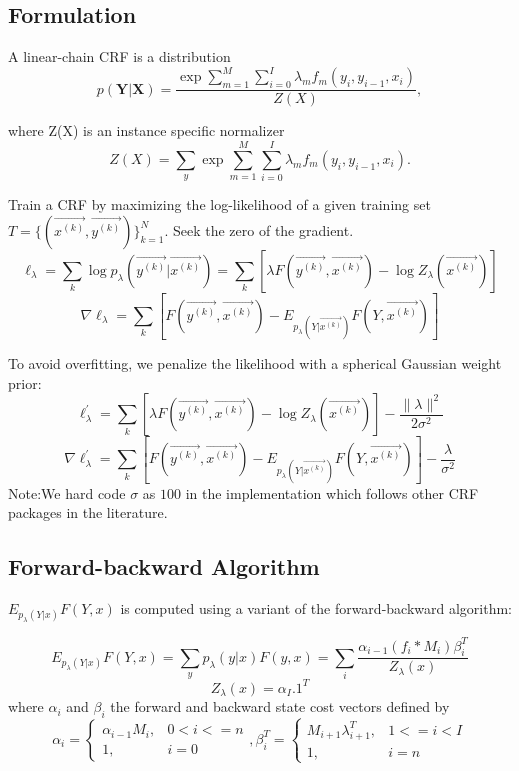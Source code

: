 \subsection{Formulation}
A linear-chain CRF \cite{DBLP:conf/naacl/ShaP03} is a distribution
    \[p(\boldsymbol Y | \boldsymbol X) = \frac{\exp{\sum_{m=1}^M \sum_{i=0}^{I} \lambda_m f_m(y_i,y_{i-1},x_i)}}{Z(X)},\]

where Z(X) is an instance specific normalizer
\[Z(X) = \sum_{y} \exp{\sum_{m=1}^M \sum_{i=0}^{I} \lambda_m f_m(y_i,y_{i-1},x_i)}.\]

Train a CRF by maximizing the log-likelihood of a given training set $ T=\{(\vec{x^{(k)}},\vec{y^{(k)}})\}_{k=1}^N$.
Seek the zero of the gradient.\\
    \[\ell_{\lambda}=\sum_k \log p_\lambda(\vec{y^{(k)}}|\vec{x^{(k)}}) =\sum_k[\lambda F(\vec{y^{(k)}},\vec{x^{(k)}})-\log Z_\lambda(\vec{x^{(k)}})]\]
    \[\nabla \ell_{\lambda}=\sum_k[F(\vec{y^{(k)}},\vec{x^{(k)}})-E_{p_\lambda(Y|\vec{x^{(k)}})}F(Y,\vec{x^{(k)}})]\]

To avoid overfitting, we penalize the likelihood with a spherical Gaussian weight prior:\\
    \[\ell_{\lambda}^\prime=\sum_k[\lambda F(\vec{y^{(k)}},\vec{x^{(k)}})-\log Z_\lambda(\vec{x^{(k)}})]-\frac{\lVert \lambda \rVert^2}{2\sigma ^2}\]
    \[\nabla \ell_{\lambda}^\prime=\sum_k[F(\vec{y^{(k)}},\vec{x^{(k)}})-E_{p_\lambda(Y|\vec{x^{(k)}})}F(Y,\vec{x^{(k)}})]-\frac{\lambda}{\sigma ^2}\]
Note:We hard code $\sigma$ as $100$ in the implementation which follows other CRF packages in the literature.

\subsection{Forward-backward Algorithm}
$E_{p_\lambda(Y|x)}F(Y,x)$ is computed using a variant of the forward-backward algorithm:

    \[E_{p_\lambda(Y|x)}F(Y,x) = \sum_y p_\lambda(y|x)F(y,x) = \sum_i\frac{\alpha_{i-1}(f_i*M_i)\beta_i^T}{Z_\lambda(x)}\]
    \[Z_\lambda(x) = \alpha_I.1^T\]
    where $\alpha_i$ and $\beta_i$ the forward and backward state cost vectors defined by\\
  \[\alpha_i =
    \begin{cases}
    \alpha_{i-1}M_i, & 0<i<=n\\
    1, & i=0
    \end{cases}
    ,
    \beta_i^T =
    \begin{cases}
    M_{i+1}\lambda_{i+1}^T, & 1<=i<I\\
    1, & i=n
    \end{cases}
  \]

